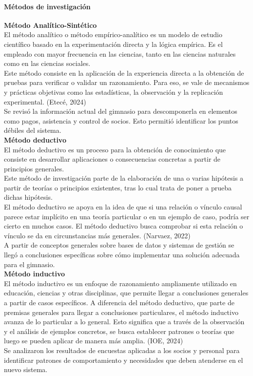 \documentclass[12pt, letterpaper]{article}
\begin{document}
\paragraph{Métodos de investigación}
\textbf{Método Analítico-Sintético}\\
El método analítico o método empírico-analítico es un modelo de estudio científico basado en la experimentación directa y la lógica empírica. Es el empleado con mayor frecuencia en las ciencias, tanto en las ciencias naturales como en las ciencias sociales.\\
Este método consiste en la aplicación de la experiencia directa a la obtención de pruebas para verificar o validar un razonamiento. Para eso, se vale de mecanismos y prácticas objetivas como las estadísticas, la observación y la replicación experimental. (Etecé, 2024)\\
Se revisó la información actual del gimnasio para descomponerla en elementos como pagos, asistencia y control de socios. Esto permitió identificar los puntos débiles del sistema.\\
\textbf{Método deductivo}\\ 
El método deductivo es un proceso para la obtención de conocimiento que consiste en desarrollar aplicaciones o consecuencias concretas a partir de principios generales. \\
Este método de investigación parte de la elaboración de una o varias hipótesis a partir de teorías o principios existentes, tras lo cual trata de poner a prueba dichas hipótesis.\\
El método deductivo se apoya en la idea de que si una relación o vínculo causal parece estar implícito en una teoría particular o en un ejemplo de caso, podría ser cierto en muchos casos. El método deductivo busca comprobar si esta relación o vínculo se da en circunstancias más generales. (Narvaez, 2022)\\
A partir de conceptos generales sobre bases de datos y sistemas de gestión se llegó a conclusiones específicas sobre cómo implementar una solución adecuada para el gimnasio.\\
\textbf{Método inductivo}\\ 
El método inductivo es un enfoque de razonamiento ampliamente utilizado en educación, ciencias y otras disciplinas, que permite llegar a conclusiones generales a partir de casos específicos. A diferencia del método deductivo, que parte de premisas generales para llegar a conclusiones particulares, el método inductivo avanza de lo particular a lo general. Esto significa que a través de la observación y el análisis de ejemplos concretos, se busca establecer patrones o teorías que luego se pueden aplicar de manera más amplia. (IOE, 2024)\\
Se analizaron los resultados de encuestas aplicadas a los socios y personal para identificar patrones de comportamiento y necesidades que deben atenderse en el nuevo sistema.
\end{document}
